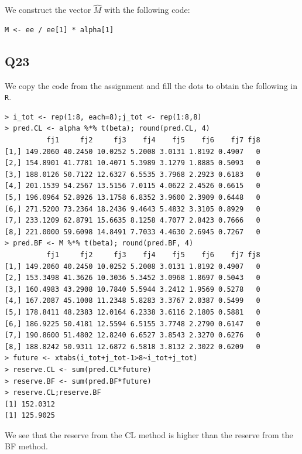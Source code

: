 \documentclass[11pt]{article}
\begin{document}
We construct the vector $\hat{M}$ with the following code:

\begin{verbatim}
M <- ee / ee[1] * alpha[1]
\end{verbatim}

\subsection*{Q23}

We copy the code from the assignment and fill the dots to obtain the following in \verb|R|.

\begin{verbatim}
> i_tot <- rep(1:8, each=8);j_tot <- rep(1:8,8)
> pred.CL <- alpha %*% t(beta); round(pred.CL, 4)
          fj1     fj2     fj3    fj4    fj5    fj6    fj7 fj8
[1,] 149.2060 40.2450 10.0252 5.2008 3.0131 1.8192 0.4907   0
[2,] 154.8901 41.7781 10.4071 5.3989 3.1279 1.8885 0.5093   0
[3,] 188.0126 50.7122 12.6327 6.5535 3.7968 2.2923 0.6183   0
[4,] 201.1539 54.2567 13.5156 7.0115 4.0622 2.4526 0.6615   0
[5,] 196.0964 52.8926 13.1758 6.8352 3.9600 2.3909 0.6448   0
[6,] 271.5200 73.2364 18.2436 9.4643 5.4832 3.3105 0.8929   0
[7,] 233.1209 62.8791 15.6635 8.1258 4.7077 2.8423 0.7666   0
[8,] 221.0000 59.6098 14.8491 7.7033 4.4630 2.6945 0.7267   0
> pred.BF <- M %*% t(beta); round(pred.BF, 4)
          fj1     fj2     fj3    fj4    fj5    fj6    fj7 fj8
[1,] 149.2060 40.2450 10.0252 5.2008 3.0131 1.8192 0.4907   0
[2,] 153.3498 41.3626 10.3036 5.3452 3.0968 1.8697 0.5043   0
[3,] 160.4983 43.2908 10.7840 5.5944 3.2412 1.9569 0.5278   0
[4,] 167.2087 45.1008 11.2348 5.8283 3.3767 2.0387 0.5499   0
[5,] 178.8411 48.2383 12.0164 6.2338 3.6116 2.1805 0.5881   0
[6,] 186.9225 50.4181 12.5594 6.5155 3.7748 2.2790 0.6147   0
[7,] 190.8600 51.4802 12.8240 6.6527 3.8543 2.3270 0.6276   0
[8,] 188.8242 50.9311 12.6872 6.5818 3.8132 2.3022 0.6209   0
> future <- xtabs(i_tot+j_tot-1>8~i_tot+j_tot)
> reserve.CL <- sum(pred.CL*future)
> reserve.BF <- sum(pred.BF*future)
> reserve.CL;reserve.BF
[1] 152.0312
[1] 125.9025
\end{verbatim}

We see that the reserve from the CL method is higher than the reserve from the BF method.
\end{document}
